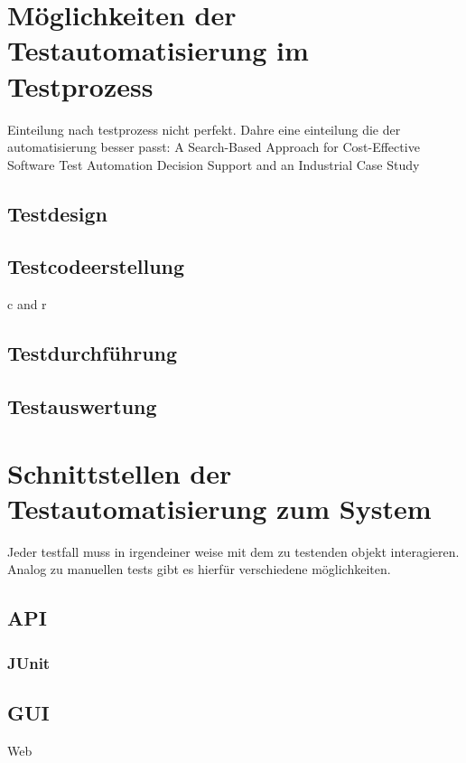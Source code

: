 \section{Möglichkeiten der Testautomatisierung im Testprozess}
\label{sec:bereiche_der_estautomatisierung}
Einteilung nach testprozess nicht perfekt. Dahre eine einteilung die der automatisierung besser passt:
A Search-Based Approach for Cost-Effective Software Test Automation Decision Support and an Industrial Case Study

\subsection{Testdesign}
\label{subsec:testdesign}


\subsection{Testcodeerstellung}
\label{subsec:testcodeerstellung}
c and r

\subsection{Testdurchführung}
\label{subsec:testdurchführung}


\subsection{Testauswertung}
\label{subsec:testauswertung}



\section{Schnittstellen der Testautomatisierung zum System}
\label{sec:schnittstellen_der_testautomatisierung_zum_syste}

Jeder testfall muss in irgendeiner weise mit dem zu testenden objekt interagieren.
Analog zu manuellen tests gibt es hierfür verschiedene möglichkeiten.
\subsection{API}
\subsubsection{JUnit}
\label{sec:junit}

\subsection{GUI}
Web
